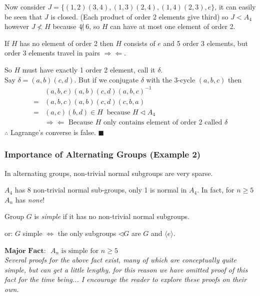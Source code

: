 \noindent Now consider $J=\{(1,2)(3,4), (1,3)(2,4), (1,4)(2,3), e\}$, it can easily be seen that $J$
is closed. (Each product of order 2 elements give third) so $J<A_4$ however $J\not < H$ because
$4\not | \ 6$, so $H$ can have at most one element of order 2.

If $H$ has no element of order 2 then $H$ consists of $e$ and 5 order 3 elements, but order 3
elements travel in pairs $\Rightarrow \Leftarrow$. \steezybreak

\noindent So $H$ must have exactly 1 order 2 element, call it $\delta$. \\
\noindent Say $\delta = (a,b)(c,d)$. But if we conjugate $\delta$ with the 3-cycle $(a,b,c)$ then
\begin{align}
    &(a,b,c)(a,b)(c,d)(a,b,c)^{-1} \nonumber \\
    =&(a,b,c)(a,b)(c,d)(c,b,a) \nonumber \\
    =&(a,c)(b,d) \in H \ \text{ because } H\triangleleft A_4 \nonumber \\
    &\Rightarrow\Leftarrow \text{ Because $H$ only contains element of order 2 called $\delta$}\nonumber
\end{align}
$\therefore$ Lagrange's converse is false. $\blacksquare$

\subsubsection{Importance of Alternating Groups (Example 2)}
In alternating groups, non-trivial normal subgroups are very sparse. \steezybreak

\noindent $A_4$ has 8 non-trivial normal sub-groups, only 1 is normal in $A_4$. In fact, for
$n\geq 5$ $A_n$ has \textit{none}!

\begin{definition}
Group $G$ is \textit{simple} if it has no non-trivial normal subgroups. \steezybreak

\noindent or:  $G$ simple $\iff$ the only subgroups $\triangleleft G$ are $G$ and
$\langle e \rangle$.
\end{definition}

\noindent $\boxed{\textbf{Major Fact:}\ \ \ A_n \text{ is simple for } n\geq 5}$\\
\textit{Several proofs for the above fact exist, many of which are conceptually quite simple, but
can get a little lengthy, for this reason we have omitted proof of this fact for the time being... I
encourage the reader to explore these proofs on their own.} \steezybreak

